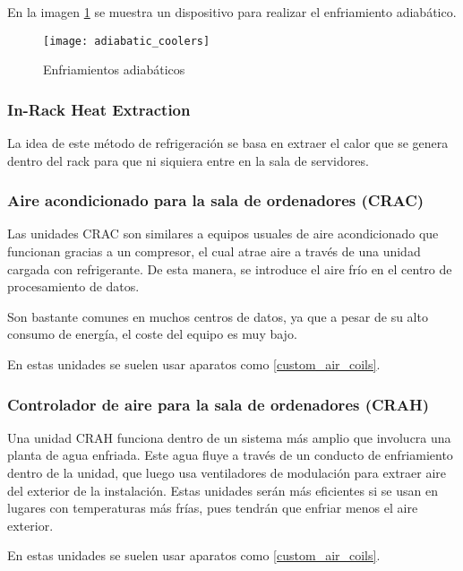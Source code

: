 En la imagen \ref{adiabatic_coolers} se muestra un dispositivo para realizar el enfriamiento adiabático.

\begin{figure}
    \begin{center}
        \label{adiabatic_coolers}
        \texttt{[image: adiabatic\_coolers]}
        \caption{Enfriamientos adiabáticos}
    \end{center}
\end{figure}

\subsubsection{In-Rack Heat Extraction}

La idea de este método de refrigeración se basa en extraer el calor que se genera dentro del rack para que ni siquiera entre en la sala de servidores.

\subsubsection{Aire acondicionado para la sala de ordenadores (CRAC)}

Las unidades CRAC son similares a equipos usuales de aire acondicionado que funcionan gracias a un compresor, el cual atrae aire a través de una unidad cargada con refrigerante. De esta manera, se introduce el aire frío en el centro de procesamiento de datos.

Son bastante comunes en muchos centros de datos, ya que a pesar de su alto consumo de energía, el coste del equipo es muy bajo.

En estas unidades se suelen usar aparatos como \ref{custom_air_coils}.

\subsubsection{Controlador de aire para la sala de ordenadores (CRAH)}

Una unidad CRAH funciona dentro de un sistema más amplio que involucra una planta de agua enfriada. Este agua fluye a través de un conducto de enfriamiento dentro de la unidad, que luego usa ventiladores de modulación para extraer aire del exterior de la instalación. Estas unidades serán más eficientes si se usan en lugares con temperaturas más frías, pues tendrán que enfriar menos el aire exterior.

En estas unidades se suelen usar aparatos como \ref{custom_air_coils}.

